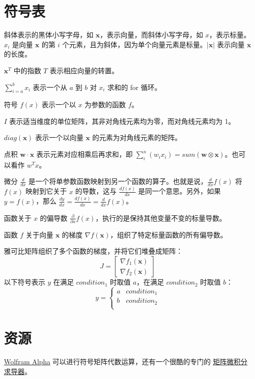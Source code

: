 \documentclass[11pt]{article}
\begin{document}
\section{符号表}\label{notation}

斜体表示的黑体小写字母，如 $\mathbf{x}$，表示向量，而斜体小写字母，如 $x$，表示标量。$x_i$ 是向量 $\mathbf{x}$ 的第 $i$ 个元素，且为斜体，因为单个向量元素是标量。$|\mathbf{x}|$ 表示向量 $\mathbf{x}$ 的长度。

$\mathbf{x}^T$ 中的指数 $T$ 表示相应向量的转置。

$\sum_{i=a}^b x_i$ 表示一个从 $a$ 到 $b$ 对 $x_i$ 求和的 for 循环。

符号 $f(x)$ 表示一个以 $x$ 为参数的函数 $f$。

$I$ 表示适当维度的单位矩阵，其非对角线元素均为零，而对角线元素均为 1。

$diag(\mathbf{x})$ 表示一个以向量 $\mathbf{x}$ 的元素为对角线元素的矩阵。

点积 $\mathbf{w} \cdot \mathbf{x}$ 表示元素对应相乘后再求和，即 $\sum_i^n (w_i x_i) = sum(\mathbf{w} \otimes \mathbf{x})$。也可以看作 $w^T x$。

微分 $\frac{d}{dx}$ 是一个将单参数函数映射到另一个函数的算子。也就是说，$\frac{d}{dx} f(x)$ 将 $f(x)$ 映射到它关于 $x$ 的导数，这与 $\frac{df(x)}{dx}$ 是同一个意思。另外，如果 $y = f(x)$，那么 $\frac{dy}{dx} = \frac{df(x)}{dx} = \frac{d}{dx}f(x)$。

函数关于 $x$ 的偏导数 $\frac{\partial}{\partial x} f(x)$，执行的是保持其他变量不变的标量导数。

函数 $f$ 关于向量 $\mathbf{x}$ 的梯度 $\nabla f(\mathbf{x})$，组织了特定标量函数的所有偏导数。

雅可比矩阵组织了多个函数的梯度，并将它们堆叠成矩阵：
\[
J = \begin{bmatrix} 
\nabla f_1(\mathbf{x})\\
\nabla f_2(\mathbf{x})
\end{bmatrix}
\]
以下符号表示 $y$ 在满足 $condition_1$ 时取值 $a$，在满足 $condition_2$ 时取值 $b$：
\[
y = \begin{cases} 
a & condition_1\\
b & condition_2\\
\end{cases}
\]

\section{资源}\label{sec10}

\href{http://www.wolframalpha.com/input/?i=D%5B%7Bx%5E2,+x%5E3%7D.%7B%7B1,2%7D,%7B3,4%7D%7D.%7Bx%5E2,+x%5E3%7D,+x%5D}{Wolfram Alpha} 可以进行符号矩阵代数运算，还有一个很酷的专门的 \href{http://www.matrixcalculus.org/}{矩阵微积分求导器}。
\end{document}
